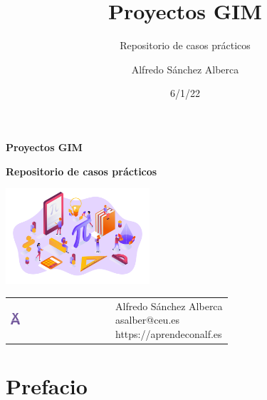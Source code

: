 \documentclass[
  a4paper,
]{scrreport}
\title{Proyectos GIM}
\subtitle{Repositorio de casos prácticos}
\author{Alfredo Sánchez Alberca}
\date{6/1/22}
\renewcommand*\contentsname{Indice de contenidos}
\newcommand\contentsname{Indice de contenidos}
\begin{document}
\begin{titlepage}

\begin{center}
\vspace*{5cm}

\Huge
{\textbf{\textsf{Proyectos GIM}}}

\vspace{0.5cm}
\LARGE
{\textbf{\textsf{Repositorio de casos prácticos}}}

\vspace{1.5cm}

\includegraphics[width=0.4\textwidth]{img/logos/proyectos.png}
\end{center}

\vfill

\begin{flushleft}
\begin{tabular}{ll}
\includegraphics[width=0.1\textwidth]{img/logos/aprendeconalf.png} & \parbox[b]{5cm}{\Large\textsf{Alfredo
Sánchez
Alberca}\\ \textsf{asalber@ceu.es} \\ \textsf{https://aprendeconalf.es}}
\end{tabular}
\end{flushleft}
\end{titlepage}\ifdefined\Shaded\renewenvironment{Shaded}{\begin{tcolorbox}[breakable, interior hidden, frame hidden, sharp corners, enhanced, boxrule=0pt, borderline west={3pt}{0pt}{shadecolor}]}{\end{tcolorbox}}\fi

\renewcommand*\contentsname{Indice de contenidos}
{
\hypersetup{linkcolor=}
\setcounter{tocdepth}{2}
\tableofcontents
}

\hypertarget{prefacio}{%
\chapter*{Prefacio}\label{prefacio}}
\end{document}
